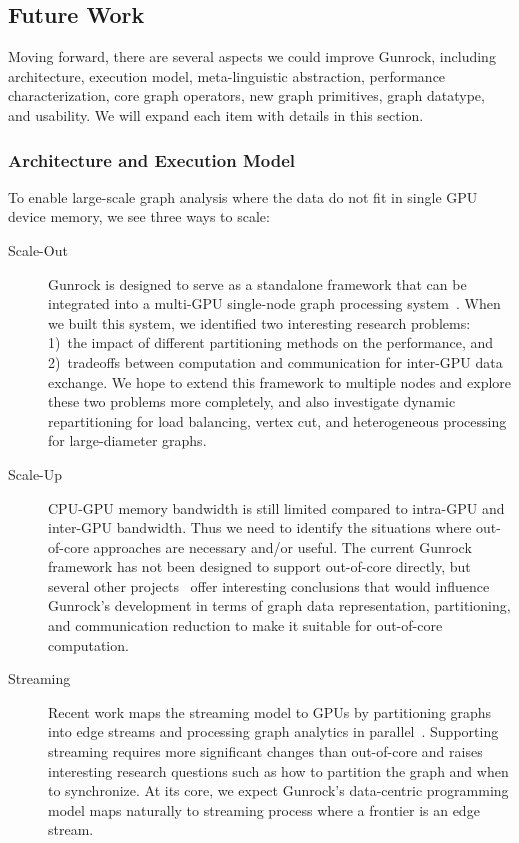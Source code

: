 \documentclass[format=acmsmall,review=false,screen=true]{acmart}
\begin{document}
\subsection{Future Work}
Moving forward, there are several aspects we could improve Gunrock,
including architecture, execution model, meta-linguistic abstraction,
performance characterization, core graph operators, new graph
primitives, graph datatype, and usability. We will expand each item
with details in this section.

\subsubsection{Architecture and Execution Model}
To enable large-scale graph analysis where the data do not fit in
single GPU device memory, we see three ways to scale:
\begin{description}
\item[Scale-Out] Gunrock is designed to serve as a standalone
  framework that can be integrated into a multi-GPU single-node graph
  processing system~\cite{Pan:2016:MGA}. When we built this system, we
  identified two interesting research problems: 1)~the impact of
  different partitioning methods on the performance, and 2)~tradeoffs
  between computation and communication for inter-GPU data exchange.
  We hope to extend this framework to multiple nodes and explore these
  two problems more completely, and also investigate dynamic
  repartitioning for load balancing, vertex cut, and heterogeneous
  processing for large-diameter graphs.
\item[Scale-Up] CPU-GPU memory bandwidth is still limited compared to
  intra-GPU and inter-GPU bandwidth. Thus we need to identify the
  situations where out-of-core approaches are necessary and/or useful.
  The current Gunrock framework has not been designed to support
  out-of-core directly, but several other
  projects~\cite{Kyrola:2012:GLG,Shi:2015:OAG} offer interesting
  conclusions that would influence Gunrock's development in terms of
  graph data representation, partitioning, and communication reduction
  to make it suitable for out-of-core computation.
\item[Streaming] Recent work maps the streaming model to GPUs by
  partitioning graphs into edge streams and processing graph analytics
  in parallel~\cite{Roy:2013:XEG,Seo:2015:GGS}. Supporting streaming
  requires more significant changes than out-of-core and raises
  interesting research questions such as how to partition the graph
  and when to synchronize. At its core, we expect Gunrock's
  data-centric programming model maps naturally to streaming process
  where a frontier is an edge stream.
\end{description}
\end{document}

